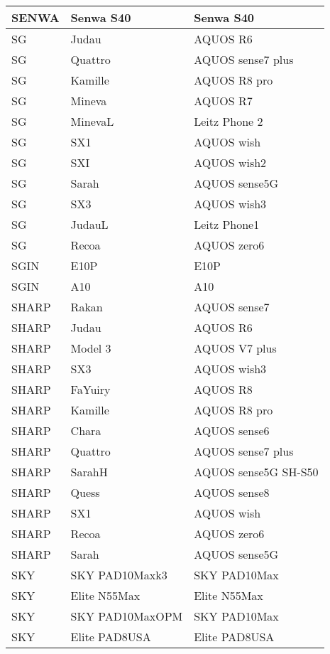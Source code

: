 \begin{tabularx}{\linewidth}{|l|X|X|}
        SENWA & Senwa S40 & Senwa S40 \\ \hline
        SG & Judau & AQUOS R6 \\ \hline
        SG & Quattro & AQUOS sense7 plus \\ \hline
        SG & Kamille & AQUOS R8 pro \\ \hline
        SG & Mineva & AQUOS R7 \\ \hline
        SG & MinevaL & Leitz Phone 2 \\ \hline
        SG & SX1 & AQUOS wish \\ \hline
        SG & SXI & AQUOS wish2 \\ \hline
        SG & Sarah & AQUOS sense5G \\ \hline
        SG & SX3 & AQUOS wish3 \\ \hline
        SG & JudauL & Leitz Phone1 \\ \hline
        SG & Recoa & AQUOS zero6 \\ \hline
        SGIN & E10P & E10P \\ \hline
        SGIN & A10 & A10 \\ \hline
        SHARP & Rakan & AQUOS sense7 \\ \hline
        SHARP & Judau & AQUOS R6 \\ \hline
        SHARP & Model 3 & AQUOS V7 plus \\ \hline
        SHARP & SX3 & AQUOS wish3 \\ \hline
        SHARP & FaYuiry & AQUOS R8 \\ \hline
        SHARP & Kamille & AQUOS R8 pro \\ \hline
        SHARP & Chara & AQUOS sense6 \\ \hline
        SHARP & Quattro & AQUOS sense7 plus \\ \hline
        SHARP & SarahH & AQUOS sense5G SH-S50 \\ \hline
        SHARP & Quess & AQUOS sense8 \\ \hline
        SHARP & SX1 & AQUOS wish \\ \hline
        SHARP & Recoa & AQUOS zero6 \\ \hline
        SHARP & Sarah & AQUOS sense5G \\ \hline
        SKY & SKY PAD10Maxk3 & SKY PAD10Max \\ \hline
        SKY & Elite N55Max & Elite N55Max \\ \hline
        SKY & SKY PAD10MaxOPM & SKY PAD10Max \\ \hline
        SKY & Elite PAD8USA & Elite PAD8USA \\ \hline

\end{tabularx}
